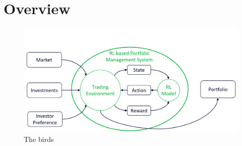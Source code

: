 \section{Overview}


\begin{figure}[h!]
  \includegraphics[width=15cm]{images/context_diagram.png}
  \caption{The birds}
  \label{fig:birds}
\end{figure}